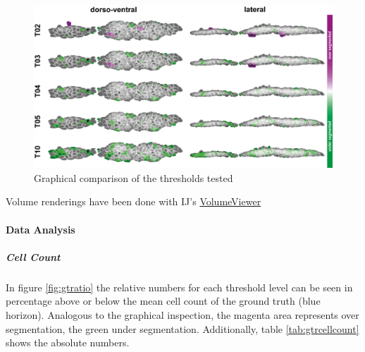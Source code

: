 \documentclass[11pt,singlespacinge,twoside]{reedthesis} %
\begin{document}
\begin{figure}

{\centering \includegraphics[width=0.85\linewidth]{figures/materials/ground_truth/volumes} 

}

\caption{Graphical comparison of the thresholds tested}\label{fig:stackcomp}
\end{figure}
\noindent Volume renderings have been done with IJ's \href{\%22https://github.com/fiji/Volume_Viewer/releases/tag/Volume_Viewer-2.01.2\%22}{VolumeViewer}

\hypertarget{data-analysis-1}{%
\paragraph{Data Analysis}\label{data-analysis-1}}

\hypertarget{cell-count}{%
\subparagraph{Cell Count}\label{cell-count}}

In figure \ref{fig:gtratio} the relative numbers for each threshold level can be seen in percentage above or below the mean cell count of the ground truth (blue horizon). Analogous to the graphical inspection, the magenta area represents over segmentation, the green under segmentation. Additionally, table \ref{tab:gtrcellcount} shows the absolute numbers.
\end{document}
